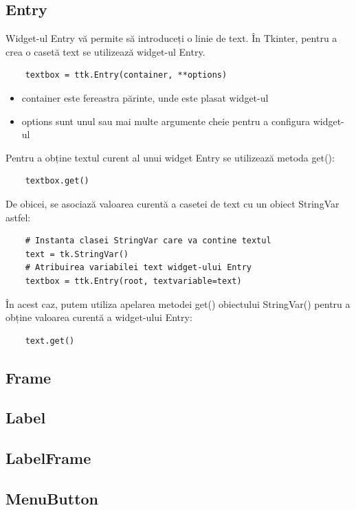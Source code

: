 \documentclass[12pt,a4paper]{book}
\begin{document}
\subsection{Entry}
Widget-ul Entry vă permite să introduceți o linie de text. În Tkinter, pentru a crea o casetă text se utilizează widget-ul Entry.
\begin{verbatim}
    textbox = ttk.Entry(container, **options)
\end{verbatim}
\begin{itemize}
\item container este fereastra părinte, unde este plasat widget-ul
\item options sunt unul sau mai multe argumente cheie pentru a configura widget-ul
\end{itemize}
Pentru a obține textul curent al unui widget Entry se utilizează metoda get():
\begin{verbatim}
    textbox.get()
\end{verbatim}
De obicei, se asociază valoarea curentă a casetei de text cu un obiect StringVar astfel:
\begin{verbatim}
    # Instanta clasei StringVar care va contine textul
    text = tk.StringVar()
    # Atribuirea variabilei text widget-ului Entry
    textbox = ttk.Entry(root, textvariable=text)
\end{verbatim}
În acest caz, putem utiliza apelarea metodei get() obiectului StringVar() pentru a obține valoarea curentă a widget-ului Entry:
\begin{verbatim}
    text.get()
\end{verbatim}



\subsection{Frame}

\subsection{Label}

\subsection{LabelFrame}

\subsection{MenuButton}
\end{document}
